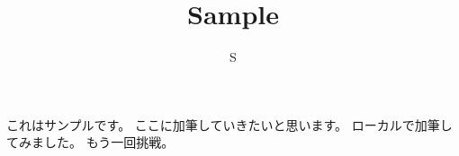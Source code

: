 \documentclass{article}
\title{Sample}
\author{S}
\begin{document}
\maketitle
これはサンプルです。
ここに加筆していきたいと思います。
ローカルで加筆してみました。
もう一回挑戦。
\end{document}
